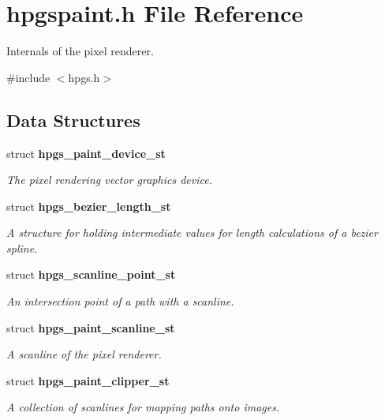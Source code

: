 \section{hpgspaint.h File Reference}
\label{hpgspaint_8h}


Internals of the pixel renderer.  


{\ttfamily \#include $<$hpgs.h$>$}\par
\subsection*{Data Structures}
\begin{DoxyCompactItemize}
\item 
struct {\bf hpgs\_\-paint\_\-device\_\-st}
\begin{DoxyCompactList}\small\item\em The pixel rendering vector graphics device. \item\end{DoxyCompactList}\item 
struct {\bf hpgs\_\-bezier\_\-length\_\-st}
\begin{DoxyCompactList}\small\item\em A structure for holding intermediate values for length calculations of a bezier spline. \item\end{DoxyCompactList}\item 
struct {\bf hpgs\_\-scanline\_\-point\_\-st}
\begin{DoxyCompactList}\small\item\em An intersection point of a path with a scanline. \item\end{DoxyCompactList}\item 
struct {\bf hpgs\_\-paint\_\-scanline\_\-st}
\begin{DoxyCompactList}\small\item\em A scanline of the pixel renderer. \item\end{DoxyCompactList}\item 
struct {\bf hpgs\_\-paint\_\-clipper\_\-st}
\begin{DoxyCompactList}\small\item\em A collection of scanlines for mapping paths onto images. \item\end{DoxyCompactList}\end{DoxyCompactItemize}
